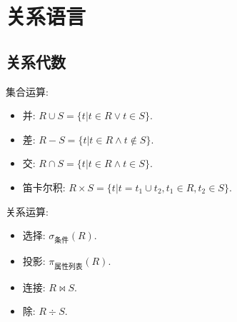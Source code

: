 \section{关系语言}
\subsection{关系代数}
\noindent 集合运算: 
\begin{itemize}
    \item 并: $R \cup S = \{t | t \in R \vee t \in S\}$.
    
    \item 差: $R - S = \{t | t \in R \wedge t \notin S\}$.
    \item 交: $R \cap S = \{t | t \in R \wedge t \in S\}$.
    \item 笛卡尔积: $R \times S = \{t | t = t_1 \cup t_2, t_1 \in R, t_2 \in S\}$.
\end{itemize}
关系运算:
\begin{itemize}
    \item 选择: $\sigma_{\text{条件}}(R)$.
    \item 投影: $\pi_{\text{属性列表}}(R)$.
    \item 连接: $R \bowtie S$.
    \item 除: $R \div S$.
\end{itemize}